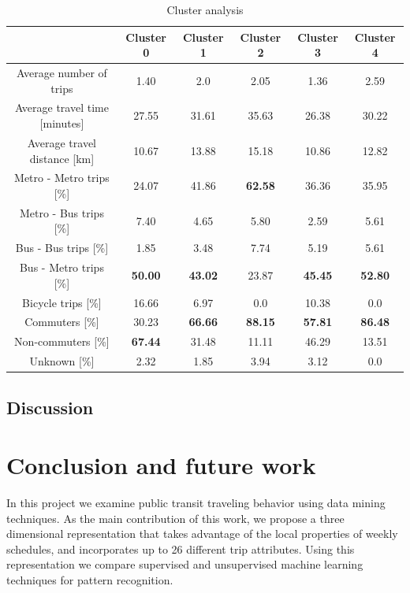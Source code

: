 \documentclass{article}
\begin{document}
\begin{table}[H]
\centering
\begin{tabular}{||c|c|c|c|c|c||}
\hline
 & \textbf{Cluster 0} & \textbf{Cluster 1} & \textbf{Cluster 2} & \textbf{Cluster 3} & \textbf{Cluster 4} \\
[0.5ex] 
\hline \hline
Average number of trips & 1.40 & 2.0 & 2.05 & 1.36 & 2.59 \\
Average travel time [minutes] & 27.55 & 31.61 & 35.63 & 26.38 & 30.22 \\
Average travel distance [km] & 10.67 & 13.88 & 15.18 & 10.86 & 12.82 \\ 
\hline
Metro - Metro trips [\%] & 24.07 & 41.86 & \textbf{62.58} & 36.36 & 35.95 \\ 
Metro - Bus trips [\%] & 7.40 & 4.65 & 5.80 & 2.59 & 5.61  \\
Bus - Bus trips [\%] & 1.85 & 3.48 & 7.74 & 5.19 & 5.61 \\ 
Bus - Metro trips [\%] & \textbf{50.00} & \textbf{43.02} & 23.87 & \textbf{45.45} & \textbf{52.80} \\ 
Bicycle trips [\%] & 16.66 & 6.97 & 0.0 & 10.38 & 0.0 \\
\hline
Commuters [\%] & 30.23 & \textbf{66.66} & \textbf{88.15} & \textbf{57.81} & \textbf{86.48} \\ 
Non-commuters [\%] & \textbf{67.44} & 31.48 & 11.11 & 46.29 & 13.51 \\ 
Unknown [\%] & 2.32 & 1.85 & 3.94 & 3.12 & 0.0 \\  [1ex]
\hline 
\end{tabular}
\caption{Cluster analysis} %
\label{table:clusterAnalysis}
\end{table}


\subsection{Discussion}


\newpage
\section{Conclusion and future work}
\label{sec:conclusion}
In this project we examine public transit traveling behavior using data mining techniques. As the main contribution of this work, we propose a three dimensional representation that takes advantage of the local properties of weekly schedules, and incorporates up to 26 different trip attributes. Using this representation we compare supervised and unsupervised machine learning techniques for pattern recognition. 
\end{document}
